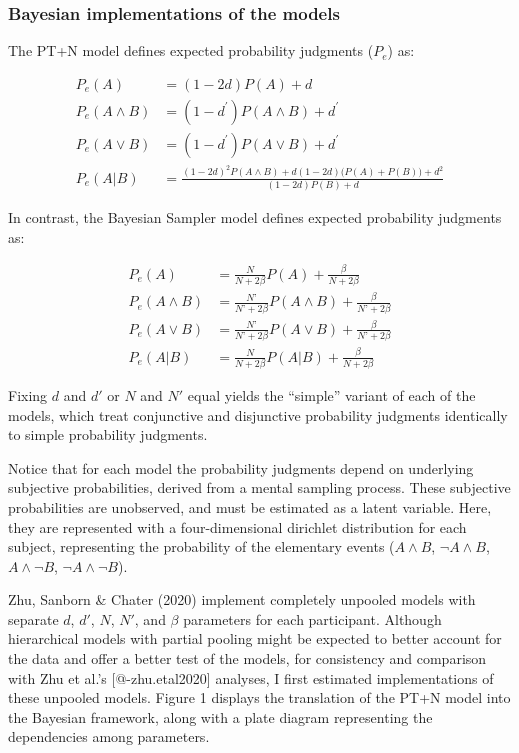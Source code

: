 \documentclass[
  english,
  man,floatsintext]{apa6}
\begin{document}
\hypertarget{bayesian-implementations-of-the-models}{%
\subsubsection{Bayesian implementations of the models}\label{bayesian-implementations-of-the-models}}

The PT+N model defines expected probability judgments (\(P_e\)) as:

\begin{align*}
  P_{e}(A) &= (1-2d)P(A) + d \\
  P_e(A\land B) &= (1-d^\prime)P(A \land B)+d^\prime \\
  P_e(A\lor B) &= (1-d^\prime)P(A \lor B)+d^\prime \\
  P_e(A|B) &= \frac{(1-2d)^2P(A \land B) + d(1-2d)\big(P(A)+P(B)\big)+d^2}{(1-2d)P(B)+d}
\end{align*}

In contrast, the Bayesian Sampler model defines expected probability judgments as:

\begin{align*}
  P_{e}(A) &= \frac{N}{N + 2 \beta}P(A) + \frac{\beta}{N+2 \beta} \\
  P_{e}(A \land B) &= \frac{N’}{N’ + 2 \beta}P(A \land B) + \frac{\beta}{N’+2 \beta} \\
  P_{e}(A \lor B) &= \frac{N’}{N’ + 2 \beta}P(A \lor B) + \frac{\beta}{N’+2 \beta} \\
  P_{e}(A|B) &= \frac{N}{N + 2 \beta}P(A|B) + \frac{\beta}{N+2 \beta}
\end{align*}

Fixing \(d\) and \(d'\) or \(N\) and \(N'\) equal yields the ``simple'' variant of each of the models, which treat conjunctive and disjunctive probability judgments identically to simple probability judgments.

Notice that for each model the probability judgments depend on underlying subjective probabilities, derived from a mental sampling process. These subjective probabilities are unobserved, and must be estimated as a latent variable. Here, they are represented with a four-dimensional dirichlet distribution for each subject, representing the probability of the elementary events (\(A \land B\), \(\neg A \land B\), \(A \land \neg B\), \(\neg A \land \neg B\)).

Zhu, Sanborn \& Chater (2020) implement completely unpooled models with separate \(d\), \(d'\), \(N\), \(N'\), and \(\beta\) parameters for each participant. Although hierarchical models with partial pooling might be expected to better account for the data and offer a better test of the models, for consistency and comparison with Zhu et al.'s {[}@-zhu.etal2020{]} analyses, I first estimated implementations of these unpooled models. Figure 1 displays the translation of the PT+N model into the Bayesian framework, along with a plate diagram representing the dependencies among parameters.
\end{document}
